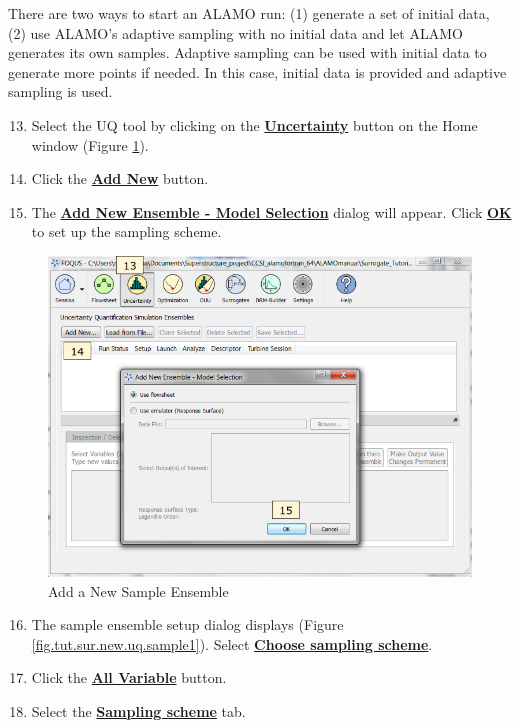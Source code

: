 There are two ways to start an ALAMO run: (1) generate a set of initial data, (2) use ALAMO's adaptive sampling with no initial data and let ALAMO generates its own samples. Adaptive sampling can be used with initial data to generate more points if needed. In this case, initial data is provided and adaptive sampling is used.

\begin{enumerate}
	\setcounter{enumi}{12}
	\item Select the UQ tool by clicking on the \textbf{\underline{Uncertainty}} button on the Home window (Figure \ref{fig.tut.sur.new.uq.ens}).
	\item Click the \textbf{\underline{Add New}} button.
	\item The \textbf{\underline{Add New Ensemble - Model Selection}} dialog will appear. Click \textbf{\underline{OK}} to set up the sampling scheme.
\end{enumerate}
\begin{figure}[H]
	\begin{center}
		\includegraphics[scale=0.55]{Chapt_surrogates/figs/uqNewEns}
		\caption{Add a New Sample Ensemble}
		\label{fig.tut.sur.new.uq.ens}
	\end{center}
\end{figure}
\begin{enumerate}
	\setcounter{enumi}{15}
	\item The sample ensemble setup dialog displays (Figure \ref{fig.tut.sur.new.uq.sample1}).  Select \textbf{\underline{Choose sampling scheme}}. 
	\item Click the \textbf{\underline{All Variable}} button.
	\item Select the \textbf{\underline{Sampling scheme}} tab.
\end{enumerate}
